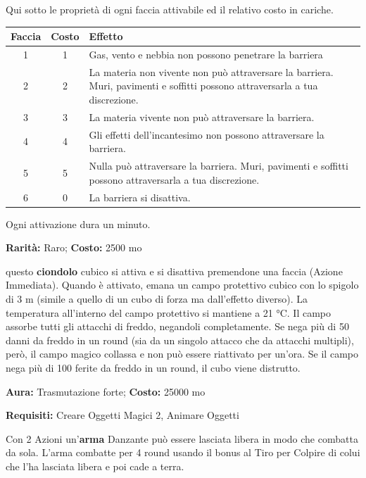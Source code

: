 \begin{multicols}{2}
\medskip

Qui sotto le proprietà di ogni faccia attivabile ed il relativo costo in cariche.

\medskip

\noindent\begin{tabularx}{\linewidth}{ccX}
	\toprule
\rowcolor{gray!20}\textbf{Faccia} & \textbf{Costo}& \textbf{Effetto}\\
\toprule
1&1 & Gas, vento e nebbia non possono penetrare la barriera\\
\rowcolor{gray!20}2&2 & La materia non vivente non può attraversare la barriera. Muri, pavimenti e soffitti possono attraversarla a tua discrezione.\\
3&3 & La materia vivente non può attraversare la barriera.\\
\rowcolor{gray!20}4&4 & Gli effetti dell'incantesimo non possono attraversare la barriera.\\
5&5 & Nulla può attraversare la barriera. Muri, pavimenti e soffitti possono attraversarla a tua discrezione.\\
\rowcolor{gray!20}6&0 & La barriera si disattiva.
\end{tabularx}

\medskip

Ogni attivazione dura un minuto.

\medskip


\textbf{Rarità:} Raro; \textbf{Costo:} 2500 mo

questo \textbf{ciondolo} cubico si attiva e si disattiva premendone una faccia (Azione Immediata). Quando è attivato, emana un campo protettivo cubico con lo spigolo di 3 m (simile a quello di un cubo di forza ma dall'effetto diverso). La temperatura all'interno del campo protettivo si mantiene a 21 °C. Il campo assorbe tutti gli attacchi di freddo, negandoli completamente. Se nega più di 50 danni da freddo in un round (sia da un singolo attacco che da attacchi multipli), però, il campo magico collassa e non può essere riattivato per un'ora. Se il campo nega più di 100 ferite da freddo in un round, il cubo viene distrutto.


\textbf{Aura:} Trasmutazione forte; \textbf{Costo:} 25000 mo

\textbf{Requisiti:} Creare Oggetti Magici 2, Animare Oggetti

Con 2 Azioni un'\textbf{arma} Danzante può essere lasciata libera in modo che combatta da sola. L'arma combatte per 4 round usando il bonus al Tiro per Colpire di colui che l'ha lasciata libera e poi cade a terra.


\end{multicols}
